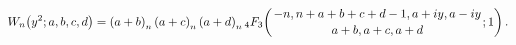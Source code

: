 \[\mathop{W_{n}\/}\nolimits\!\left(y^{2};a,b,c,d\right)=\left(a+b\right)_{n}%
\left(a+c\right)_{n}\left(a+d\right)_{n}\*\mathop{{{}_{4}F_{3}}\/}\nolimits\!%
\left({-n,n+a+b+c+d-1,a+iy,a-iy\atop a+b,a+c,a+d};1\right).\]